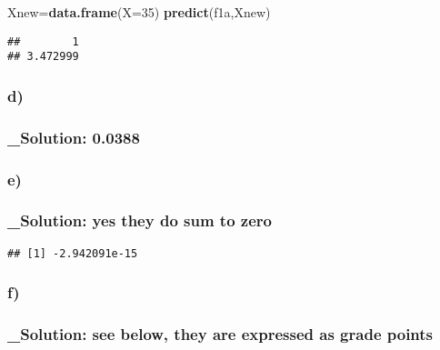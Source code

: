 \documentclass[
]{article}
\newenvironment{Shaded}{\begin{snugshade}}{\end{snugshade}}
\newcommand{\DataTypeTok}[1]{\textcolor[rgb]{0.13,0.29,0.53}{#1}}
\newcommand{\DecValTok}[1]{\textcolor[rgb]{0.00,0.00,0.81}{#1}}
\newcommand{\KeywordTok}[1]{\textcolor[rgb]{0.13,0.29,0.53}{\textbf{#1}}}
\newcommand{\NormalTok}[1]{#1}
\newcommand{\OperatorTok}[1]{\textcolor[rgb]{0.81,0.36,0.00}{\textbf{#1}}}
\begin{document}
\begin{Shaded}
\begin{Highlighting}[]
\NormalTok{Xnew=}\KeywordTok{data.frame}\NormalTok{(}\DataTypeTok{X=}\DecValTok{35}\NormalTok{)}
\KeywordTok{predict}\NormalTok{(f1a,Xnew)}
\end{Highlighting}
\end{Shaded}

\begin{verbatim}
##        1 
## 3.472999
\end{verbatim}

\hypertarget{d}{%
\subsubsection{d)}\label{d}}

\hypertarget{solution-0.0388}{%
\subsubsection{\_Solution: 0.0388}\label{solution-0.0388}}

\hypertarget{e}{%
\subsubsection{e)}\label{e}}

\hypertarget{solution-yes-they-do-sum-to-zero}{%
\subsubsection{\_Solution: yes they do sum to
zero}\label{solution-yes-they-do-sum-to-zero}}

\begin{Shaded}
\end{Shaded}

\begin{verbatim}
## [1] -2.942091e-15
\end{verbatim}

\hypertarget{f}{%
\subsubsection{f)}\label{f}}

\hypertarget{solution-see-below-they-are-expressed-as-grade-points}{%
\subsubsection{\_Solution: see below, they are expressed as grade
points}\label{solution-see-below-they-are-expressed-as-grade-points}}
\end{document}
